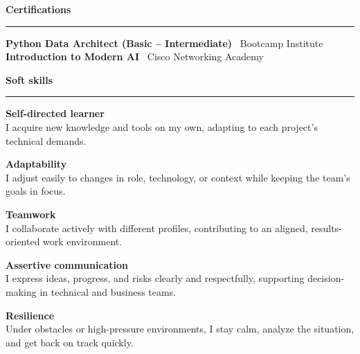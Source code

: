 \documentclass[10pt,a4paper]{article}
\newcommand{\sectionline}[1]{
\vspace{4pt}
\begin{center}
\textbf{\large #1}
\end{center}
\vspace{-1.5mm}
\hrule
\vspace{3pt}
}
\begin{document}
\sectionline{Certifications}
\textbf{Python Data Architect (Basic -- Intermediate)} \dotfill \ Bootcamp Institute\\
\textbf{Introduction to Modern AI} \dotfill \ Cisco Networking Academy

\sectionline{Soft skills}
\textbf{Self-directed learner}\\
I acquire new knowledge and tools on my own, adapting to each project's technical demands.

\textbf{Adaptability}\\
I adjust easily to changes in role, technology, or context while keeping the team's goals in focus.

\textbf{Teamwork}\\
I collaborate actively with different profiles, contributing to an aligned, results-oriented work environment.

\textbf{Assertive communication}\\
I express ideas, progress, and risks clearly and respectfully, supporting decision-making in technical and business teams.

\textbf{Resilience}\\
Under obstacles or high-pressure environments, I stay calm, analyze the situation, and get back on track quickly.
\end{document}
